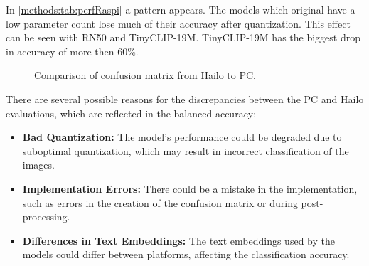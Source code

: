 In \cref{methods:tab:perfRaspi} a pattern appears.
The models which original have a low parameter count lose much of their accuracy after quantization.
This effect can be seen with RN50 and TinyCLIP-19M.
TinyCLIP-19M has the biggest drop in accuracy of more then 60\%.

\begin{figure}[!h]
    \centering
    \caption{Comparison of confusion matrix from Hailo to PC.}
    \label{methods:fig:compareConfM}
\end{figure}

There are several possible reasons for the discrepancies between the PC and Hailo evaluations, which are reflected in the balanced accuracy:
\begin{itemize}
    \item \textbf{Bad Quantization:} The model's performance could be degraded due to suboptimal quantization, which may result in incorrect classification of the images.
    \item \textbf{Implementation Errors:} There could be a mistake in the implementation, such as errors in the creation of the confusion matrix or during post-processing.
    \item \textbf{Differences in Text Embeddings:} The text embeddings used by the models could differ between platforms, affecting the classification accuracy.
\end{itemize}

